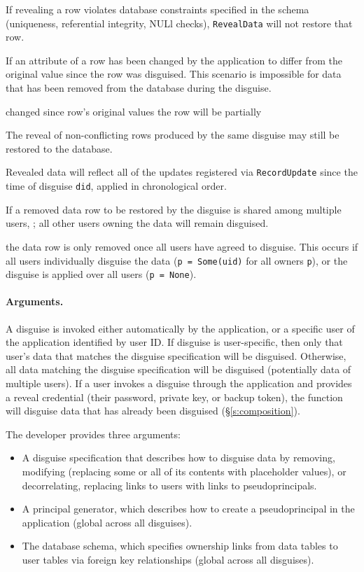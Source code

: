     If revealing a row violates database constraints specified in the schema
    (\eg uniqueness, referential integrity, NULl checks), \texttt{RevealData} will not
    restore that row.  

    If an attribute of a row has been changed by the application to differ from
    the original value since the row was disguised. This scenario is impossible for
    data that has been removed from the database during the disguise.

    changed since row's original values the
    row will be partially 

    The reveal of non-conflicting rows produced by the same
    disguise may still be restored to the database.

    Revealed data will reflect all of the updates registered via
    \texttt{RecordUpdate} since the time of disguise \texttt{did}, applied in
    chronological order.

    If a removed data row to be restored by the disguise is shared among
    multiple users, ; all other users owning the
    data will remain disguised.


    the data row is only removed once all users have agreed to disguise. This
    occurs if \one{} all users individually disguise the data (\texttt{p =
    Some(uid)} for all owners \texttt{p}), or \two{} the disguise is applied
    over all users (\texttt{p = None}).

    \paragraph{Arguments.} 
    A disguise is invoked either automatically by the application, or a specific
    user of the application identified by user ID. 
    If disguise is user-specific, then only that user's data that matches the
    disguise specification will be disguised.  Otherwise, all data matching the
    disguise specification will be disguised (potentially data of multiple
    users). 
    If a user invokes a disguise through the application and provides a reveal
    credential (their password, private key, or backup token), the function 
    will disguise data
    that has already been disguised (\S\ref{s:composition}).

    The developer provides three arguments:
    \begin{itemize}[nosep]
    \item A disguise specification that describes how to disguise data by
    removing, modifying (replacing some or all of its contents with placeholder
    values), or decorrelating, replacing links to users with links to
    pseudoprincipals.
    
    \item A principal generator, which describes how to create a
    pseudoprincipal in the application (global across all disguises).
    
    \item The database schema, which specifies ownership links from data tables to user
    tables via foreign key relationships (global across all disguises).
    \end{itemize}

